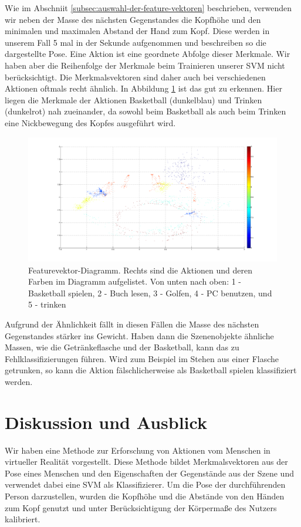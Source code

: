 Wie im Abschniit \ref{subsec:auswahl-der-feature-vektoren} beschrieben, verwenden wir neben der Masse des nächsten Gegenstandes die Kopfhöhe und den minimalen und maximalen Abstand der Hand zum Kopf. Diese werden in unserem Fall 5 mal in der Sekunde aufgenommen und beschreiben so die dargestellte Pose. Eine Aktion ist eine geordnete Abfolge dieser Merkmale. Wir haben aber die Reihenfolge der Merkmale beim Trainieren unserer SVM nicht berücksichtigt. Die Merkmalsvektoren sind daher auch bei verschiedenen Aktionen oftmals recht ähnlich. In Abbildung \ref{fig:Merkmalvektoren-Diagramm} ist das gut zu erkennen. Hier liegen die Merkmale der Aktionen Basketball (dunkelblau) und Trinken (dunkelrot) nah zueinander, da sowohl beim Basketball als auch beim Trinken eine Nickbewegung des Kopfes ausgeführt wird.\newline
\begin{figure}[hbtp]
\includegraphics[width=1.0\linewidth]{altefeatures4.png}
\caption{Featurevektor-Diagramm. Rechts sind die Aktionen und deren Farben im Diagramm aufgelistet. Von unten nach oben: 1 - Basketball spielen, 2 - Buch lesen, 3 - Golfen, 4 - PC benutzen, und 5 - trinken }
\label{fig:Merkmalvektoren-Diagramm}
\end{figure}
Aufgrund der Ähnlichkeit fällt in diesen Fällen die Masse des nächsten Gegenstandes stärker ins Gewicht. Haben dann die Szenenobjekte ähnliche Massen, wie die Getränkeflasche und der Basketball, kann das zu Fehlklassifizierungen führen. Wird zum Beispiel im Stehen aus einer Flasche getrunken, so kann die Aktion fälschlicherweise als \glqq{}Basketball spielen\grqq{} klassifiziert werden. 

\section{Diskussion und Ausblick}
Wir haben eine Methode zur Erforschung von Aktionen vom Menschen in virtueller Realität vorgestellt. Diese Methode bildet Merkmalsvektoren aus der Pose eines Menschen und den Eigenschaften der Gegenstände aus der Szene und verwendet dabei eine SVM als Klassifizierer. Um die Pose der durchführenden Person darzustellen, wurden die Kopfhöhe und die Abstände von den Händen zum Kopf genutzt und unter Berücksichtigung der Körpermaße des Nutzers kalibriert. 


